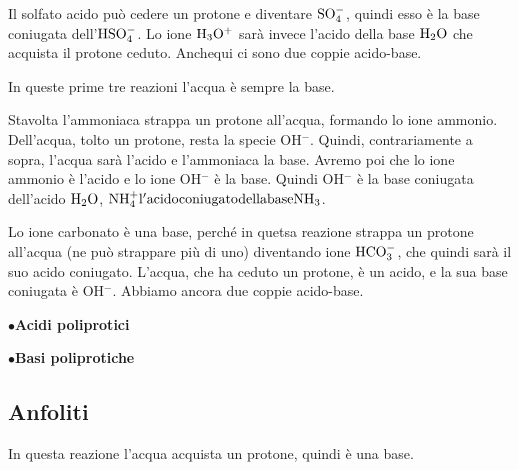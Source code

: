 \vspace{0.2cm}

\vspace{0.2cm}Il solfato acido può cedere un protone e diventare $\rm SO_4^-$, quindi esso è la base coniugata dell'$\rm HSO_4^-$. Lo ione $\rm H_3O^+$ sarà invece l'acido della base $\rm H_2O$ che acquista il protone ceduto. Anchequi ci sono due coppie acido-base.

\vspace{0.2cm}In queste prime tre reazioni l'acqua è sempre la base.

\vspace{0.2cm}

\vspace{0.2cm}Stavolta l'ammoniaca strappa un protone all'acqua, formando lo ione ammonio. Dell'acqua, tolto un protone, resta la specie OH$^-$. Quindi, contrariamente a sopra, l'acqua sarà l'acido e l'ammoniaca la base. Avremo poi che lo ione ammonio è l'acido e lo ione OH$^-$ è la base. Quindi OH$^-$ è la base coniugata dell'acido $\rm H_2O$, $\rm NH_4^+ l'acido coniugato della base NH_3$.

\vspace{0.2cm}

\vspace{0.2cm}Lo ione carbonato è una base, perché in quetsa reazione strappa un protone all'acqua (ne può strappare più di uno) diventando ione $\rm HCO_3^-$, che quindi sarà il suo acido coniugato. L'acqua, che ha ceduto un protone, è un acido, e la sua base coniugata è OH$^-$. Abbiamo ancora due coppie acido-base.

\vspace{0.2cm}$\bullet$\textbf{Acidi poliprotici}

\vspace{0.2cm}$\bullet$\textbf{Basi poliprotiche}
\subsection{Anfoliti}


\vspace{0.2cm}In questa reazione l'acqua acquista un protone, quindi è una base.

\vspace{0.2cm}

